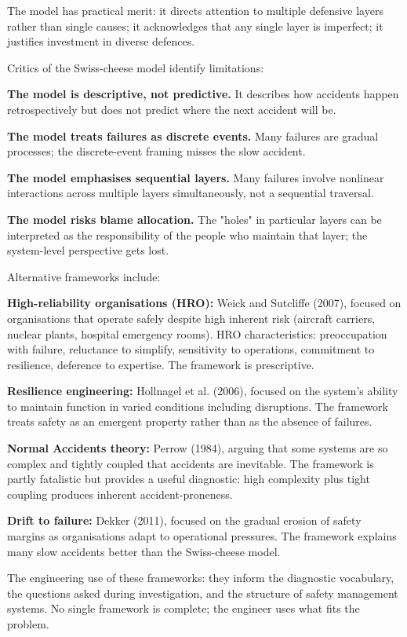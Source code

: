 The model has practical merit: it directs attention to multiple defensive layers rather than single causes; it acknowledges that any single layer is imperfect; it justifies investment in diverse defences.

Critics of the Swiss-cheese model identify limitations:

\textbf{The model is descriptive, not predictive.} It describes how accidents happen retrospectively but does not predict where the next accident will be.

\textbf{The model treats failures as discrete events.} Many failures are gradual processes; the discrete-event framing misses the slow accident.

\textbf{The model emphasises sequential layers.} Many failures involve nonlinear interactions across multiple layers simultaneously, not a sequential traversal.

\textbf{The model risks blame allocation.} The "holes" in particular layers can be interpreted as the responsibility of the people who maintain that layer; the system-level perspective gets lost.

Alternative frameworks include:

\textbf{High-reliability organisations (HRO):} Weick and Sutcliffe (2007), focused on organisations that operate safely despite high inherent risk (aircraft carriers, nuclear plants, hospital emergency rooms). HRO characteristics: preoccupation with failure, reluctance to simplify, sensitivity to operations, commitment to resilience, deference to expertise. The framework is prescriptive.

\textbf{Resilience engineering:} Hollnagel et al. (2006), focused on the system's ability to maintain function in varied conditions including disruptions. The framework treats safety as an emergent property rather than as the absence of failures.

\textbf{Normal Accidents theory:} Perrow (1984), arguing that some systems are so complex and tightly coupled that accidents are inevitable. The framework is partly fatalistic but provides a useful diagnostic: high complexity plus tight coupling produces inherent accident-proneness.

\textbf{Drift to failure:} Dekker (2011), focused on the gradual erosion of safety margins as organisations adapt to operational pressures. The framework explains many slow accidents better than the Swiss-cheese model.

The engineering use of these frameworks: they inform the diagnostic vocabulary, the questions asked during investigation, and the structure of safety management systems. No single framework is complete; the engineer uses what fits the problem.

